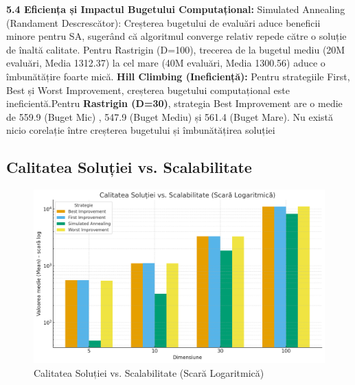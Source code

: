 \documentclass[
]{article}
\begin{document}
\textbf{5.4 Eficiența și Impactul Bugetului Computațional:} Simulated
Annealing (Randament Descrescător): Creșterea bugetului de evaluări
aduce beneficii minore pentru SA, sugerând că algoritmul converge
relativ repede către o soluție de înaltă calitate. Pentru Rastrigin
(D=100), trecerea de la bugetul mediu (20M evaluări, Media 1312.37) la
cel mare (40M evaluări, Media 1300.56) aduce o îmbunătățire foarte mică.
\textbf{Hill Climbing (Ineficiență):} Pentru strategiile First, Best și
Worst Improvement, creșterea bugetului computațional este
ineficientă.Pentru \textbf{Rastrigin (D=30)}, strategia Best Improvement
are o medie de 559.9 (Buget Mic) , 547.9 (Buget Mediu) și 561.4 (Buget
Mare). Nu există nicio corelație între creșterea bugetului și
îmbunătățirea soluției

\subsection{Calitatea Soluției vs. Scalabilitate}

\begin{figure}[htbp]
	\centering
	\includegraphics[width=\textwidth]{vertopal_3cc9e404d6084a9aa4179e4b559e5481/media/image5.png}
	\caption{Calitatea Soluției vs. Scalabilitate (Scară Logaritmică) }
	\label{fig:calitate-scalabilitate}
\end{figure}
\end{document}

